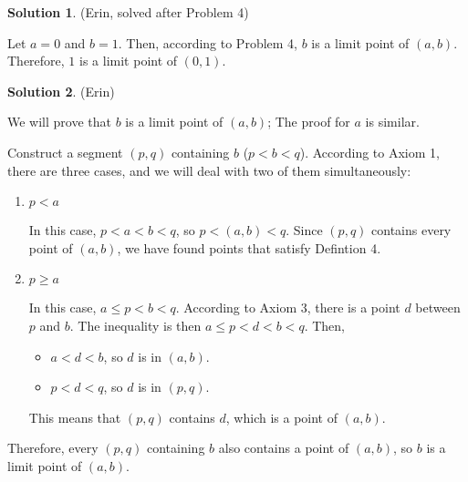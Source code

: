 \documentclass{article}
\theoremstyle{definition}
\newtheorem{solution}{Solution}
\begin{document}
\begin{solution} %
(Erin, solved after Problem 4)

Let $a = 0$ and $b = 1$. Then, according to Problem 4, $b$ is a limit point of $(a, b)$. Therefore, $1$ is a limit point of $(0,1)$.
\end{solution}

\begin{solution} %
(Erin)

We will prove that $b$ is a limit point of $(a, b)$; The proof for $a$ is similar.

Construct a segment $(p, q)$ containing $b$ ($p < b < q$).
According to Axiom 1, there are three cases, and we will deal with two of them simultaneously:

\begin{enumerate}
\item $p < a$

In this case, $p < a < b < q$, so $p < (a, b) < q$.
Since $(p, q)$ contains every point of $(a, b)$, we have found points that satisfy Defintion 4.

\item $p \geq a$

In this case, $a \leq p < b < q$.
According to Axiom 3, there is a point $d$ between $p$ and $b$. 
The inequality is then $a \leq p < d < b < q$.
Then,

\begin{itemize}
\item $a < d < b$, so $d$ is in $(a, b)$.
\item $p < d < q$, so $d$ is in $(p, q)$.
\end{itemize}

This means that $(p, q)$ contains $d$, which is a point of $(a, b)$.
\end{enumerate}

Therefore, every $(p, q)$ containing $b$ also contains a point of $(a, b)$, so $b$ is a limit point of $(a, b)$.
\end{solution}
\end{document}
